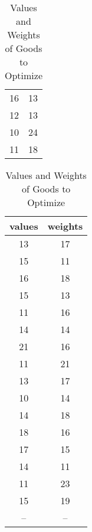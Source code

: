 \begin{table}[H]
\begin{tabular}{cc}
        16     & 13      \\
        12     & 13      \\
        10     & 24      \\
        11     & 18      \\
        \bottomrule
    \end{tabular}
    \hspace{5pt}
    \begin{tabular}{cc}
        \toprule
        \toprule
        values & weights \\
        \midrule
        13     & 17      \\
        15     & 11      \\
        16     & 18      \\
        15     & 13      \\
        11     & 16      \\
        14     & 14      \\
        21     & 16      \\
        11     & 21      \\
        13     & 17      \\
        10     & 14      \\
        14     & 18      \\
        18     & 16      \\
        17     & 15      \\
        14     & 11      \\
        11     & 23      \\
        15     & 19      \\
        --     & --      \\
        \bottomrule
    \end{tabular}
    \caption{Values and Weights of Goods to Optimize}
    \label{tab:problemdata}
\end{table}
